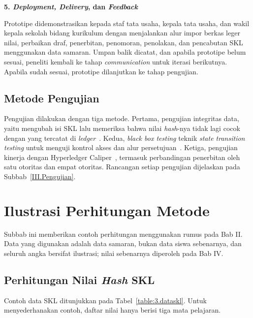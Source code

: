 \textbf{5. \textit{Deployment, Delivery}, dan \textit{Feedback}}

Prototipe didemonstrasikan kepada staf tata usaha, kepala tata usaha, dan wakil kepala sekolah bidang kurikulum dengan menjalankan alur impor berkas leger nilai, perbaikan draf, penerbitan, penomoran, penolakan, dan pencabutan SKL menggunakan data samaran. Umpan balik dicatat, dan apabila prototipe belum sesuai, peneliti kembali ke tahap \textit{communication} untuk iterasi berikutnya. Apabila sudah sesuai, prototipe dilanjutkan ke tahap pengujian.

\subsection{Metode Pengujian}
Pengujian dilakukan dengan tiga metode. Pertama, pengujian integritas data, yaitu mengubah isi SKL lalu memeriksa bahwa nilai \textit{hash}-nya tidak lagi cocok dengan yang tercatat di \textit{ledger}~\cite{Blanco2025Digital}. Kedua, \textit{black box testing} teknik \textit{state transition testing} untuk menguji kontrol akses dan alur persetujuan~\cite{Putri2024BlackBox,Augenio2025StateTransition}. Ketiga, pengujian kinerja dengan Hyperledger Caliper~\cite{Caliper}, termasuk perbandingan penerbitan oleh satu otoritas dan empat otoritas. Rancangan setiap pengujian dijelaskan pada Subbab~\ref{III.Pengujian}.

\section{Ilustrasi Perhitungan Metode}
Subbab ini memberikan contoh perhitungan menggunakan rumus pada Bab II. Data yang digunakan adalah data samaran, bukan data siswa sebenarnya, dan seluruh angka bersifat ilustrasi; nilai sebenarnya diperoleh pada Bab IV.

\subsection{Perhitungan Nilai \textit{Hash} SKL}
Contoh data SKL ditunjukkan pada Tabel~\ref{table:3.dataskl}. Untuk menyederhanakan contoh, daftar nilai hanya berisi tiga mata pelajaran.

